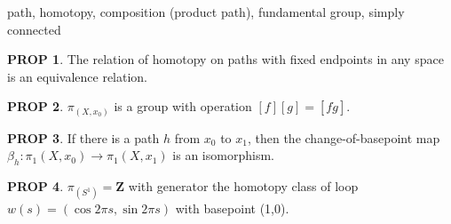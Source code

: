 \documentclass[11pt]{article}
\theoremstyle{definition}
\theoremstyle{dotles}
\theoremstyle{dotless}
\newtheorem{proposition}{PROP}[section]
\theoremstyle{remark}
\begin{document}
path, homotopy, composition (product path), fundamental group, simply connected

\begin{proposition}
The relation of homotopy on paths with fixed endpoints in any space is an equivalence relation.
\end{proposition}

\begin{proposition}
$\pi_(X,x_0)$ is a group with operation $[f][g]=[f\dot g]$.
\end{proposition}

\begin{proposition}
If there is a path $h$ from $x_0$ to $x_1$, then the change-of-basepoint map $\beta_h:\pi_1(X,x_0)\to\pi_1(X,x_1)$ is an isomorphism.
\end{proposition}

\begin{proposition}
$\pi_(S^1)=\mathbf{Z}$ with generator the homotopy class of loop $w(s)=(\cos2\pi s,\sin2\pi s)$ with basepoint (1,0).
\end{proposition}
\end{document}
